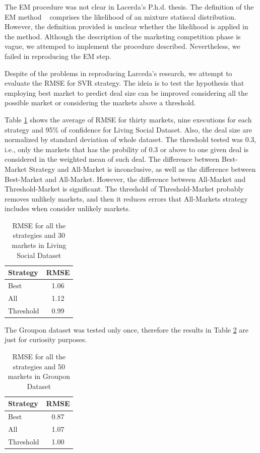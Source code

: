 \documentclass{acm_proc_article-sp}
\begin{document}
The EM procedure was not clear in Lacerda's P.h.d. thesis. The definition of 
the EM method ~\cite{hastie2009elements} comprises the likelihood 
of an mixture statiscal distribution. However, the definition 
provided is unclear whether the likelihood is applied in the 
method. Although the description of  the 
marketing competition phase is vague, we attemped to implement 
the procedure described. Nevertheless, we failed in reproducing 
the EM step.

Despite of the problems in reproducing Larceda's research, we 
attempt to evaluate the  RMSE for SVR strategy. The ideia is 
to test the hypothesis that employing best market to 
predict deal size can be improved considering all the possible 
market or considering the markets above a threshold.

Table \ref{rmsetable} shows the average of RMSE for thirty markets,  
nine executions for each strategy and 95\% of confidence for 
Living Social Dataset. Also, the deal size are normalized by 
standard deviation of whole dataset.
The threshold tested was $0.3$, i.e., 
only the markets that has the probility of $0.3$ or above to 
 one given deal is considered in the weighted mean of such deal. 
The difference between Best-Market 
Strategy and All-Market is 
inconclusive, as well as the difference between Best-Market and 
All-Market. However, the difference between All-Market and 
Threshold-Market is significant. The threshold of Threshold-Market 
probably removes unlikely markets, and then it reduces errors
that All-Markets strategy includes when consider unlikely 
markets. 


\begin{table}[H]
    \centering
    \caption{RMSE for all the strategies and 30 markets in Living Social Dataset}
    \label{rmsetable}
    \begin{tabular}{lc} \hline
	Strategy & RMSE \\ \hline \hline
	Best & 1.06\\
        All & 1.12 \\
	Threshold & 0.99 \\ \hline
    \end{tabular}
\end{table}

The Groupon dataset was tested only once, therefore the results in Table 
\ref{rmsetablegroupon} are just for curiosity purposes.

\begin{table}[H]
    \centering
    \caption{RMSE for all the strategies and 50 markets in Groupon Dataset}
    \label{rmsetablegroupon}
    \begin{tabular}{lc} \hline
	Strategy & RMSE \\ \hline \hline
	Best & 0.87\\
        All & 1.07 \\
	Threshold & 1.00 \\ \hline
    \end{tabular}
\end{table}
\end{document}
